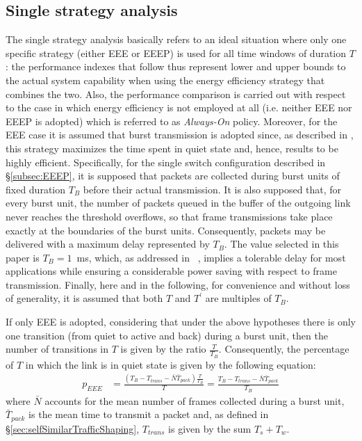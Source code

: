 \documentclass[journal,10pt,twoside,final]{IEEEtran}
\begin{document}
\subsection{Single strategy analysis}
\label{sec:singleWindowAnalysis}

The single strategy analysis basically refers to an ideal situation where only one specific strategy (either EEE or EEEP) is used for all time windows of duration $T$: the performance indexes that follow thus represent lower and upper bounds to the actual system capability when using the energy efficiency strategy that combines the two. Also, the performance comparison is carried out with respect to the case in which energy efficiency is not employed at all (i.e. neither EEE nor EEEP is adopted) which is referred to as \emph{Always-On} policy. Moreover, for the EEE case it is assumed that burst transmission is adopted since, as described in \cite{ReviriegoMaestroHernandez10}, this strategy maximizes the time spent in quiet state and, hence, results to be highly efficient. Specifically, for the single switch configuration described in \S\ref{subsec:EEEP}, it is supposed that packets are collected during burst units of fixed duration $T_B$ before their actual transmission. It is also supposed that, for every burst unit, the number of packets queued in the buffer of the outgoing link never reaches the threshold overflows, so that frame transmissions take place exactly at the boundaries of the burst units. Consequently, packets may be delivered with a maximum delay represented by $T_B$. The value selected in this paper is ${T_B=1}$~ms, which, as addressed in ~\cite{ReviriegoMaestroHernandez10}, implies a tolerable delay for most applications while ensuring a considerable power saving with respect to frame transmission.
Finally, here and in the following, for convenience and without loss of generality, it is assumed that both $T$ and $T^\prime$ are multiples of $T_B$.

If only EEE is adopted, considering that under the above hypotheses there is only one transition (from quiet to active and back) during a burst unit, then the number of transitions in $T$ is given by the ratio $\frac{T}{T_B}$. Consequently, the percentage of $T$ in which the link is in quiet state is given by the following equation:
\begin{align}
p_{EEE} &= \frac{\left(T_B - T_{trans} - \bar{N} \bar{T}_{pack}\right)\frac{T}{T_B}}{T}= \frac{T_B - T_{trans} - \bar{N} \bar{T}_{pack}}{T_B}
\label{eq:pEEE1}
\end{align}
where $\bar{N}$ accounts for the mean number of frames collected during a burst unit, $\bar{T}_{pack}$ is the mean time to transmit a packet and, as defined in \S\ref{sec:selfSimilarTrafficShaping}, $T_{trans}$ is given by the sum $T_s+T_w$. 
\end{document}
